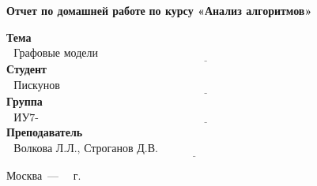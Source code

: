 \begin{titlepage}
	\begin{center}
		\Large\textbf{Отчет по домашней работе}
		\Large\textbf{по курсу «Анализ алгоритмов»}
	\end{center}
	\text{}\newline
	
	\noindent\textbf{Тема} $\underline{\text{~~Графовые модели алгоритмов~~~~~~~~`~~~~~~~~~~~~~~~~~~~~~~~~~~~~~~~~~~~~~~~~~~~~~~~~~~~~~~~~~~~~~~~~~~~~}}$\newline\newline\newline
	\noindent\textbf{Студент} $\underline{\text{~~Пискунов П.~~~~~~~~~~~~~~~~~~~~~~~~~~~~~~~~~~~~~~~~~~~~~~~~~~~~~~~~~~~~~~~~~~~~~~~~~~~~~~~~~~~~~~~~~~~~~~~~}}$\newline\newline
	\noindent\textbf{Группа} $\underline{\text{~~ИУ7-56Б~~~~~~~~~~~~~~~~~~~~~~~~~~~~~~~~~~~~~~~~~~~~~~~~~~~~~~~~~~~~~~~~~~~~~~~~~~~~~~~~~~~~~~~~~~~~~~~~~~~~~~~}}$\newline\newline
	\noindent\textbf{Преподаватель} $\underline{\text{~~Волкова Л.Л., Строганов Д.В.~~~~~~~~~~~~~~~~~~~~~~~~~~~~~~~~~~~~~~~~~~~~~~~~~~~~~~~~~~~~~}}$\newline
	
	\begin{center}
		\vfill
		Москва~---~\the\year
		~г.
	\end{center}
	\restoregeometry
	
\end{titlepage}